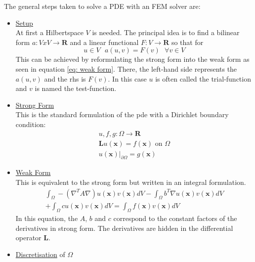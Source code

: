 \documentclass[./\jobname.tex,hidelinks]{subfiles}
\begin{document}
The general steps taken to solve a PDE with an FEM solver are: 
\begin{itemize}
	\item \underline{Setup} \\
		  At first a Hilbertspace $V$ is needed. The principal idea is to find a bilinear form $a: V x V \rightarrow \mathbf{R}$ and a linear functional $F: V \rightarrow \mathbf{R}$ so that for 
		  \begin{equation}
			  u \in V \text{   } a(u,v) = F(v) \text{   } \forall v \in V
		  \end{equation}
		  This can be achieved by reformulating the strong form into the weak form as seen in equation \ref{eq: weak form}. There, the left-hand side represents the $a(u,v)$ and the \gls{rhs} is $F(v)$. In this case $u$ is often called the trial-function and $v$ is named the test-function. 
	\item \underline{Strong Form} \\
		  This is the standard formulation of the \gls{pde} with a Dirichlet boundary condition: \\
		  \begin{equation}
			  \begin{split}
			  	u, f, g: \Omega \rightarrow \mathbf{R} \\
				\mathbf{L} u(\mathbf{x}) = f(\mathbf{x}) \text{ on $\Omega$} \\
				u(\mathbf{x})|_{\partial \Omega} = g(\mathbf{x})
			  \end{split}
		  \end{equation}
	\item \underline{Weak Form} \\
		  This is equivalent to the strong form but written in an integral formulation. \\
		  \begin{equation}
		  \label{eq: weak form}
			  \begin{split}
			      \int_{\Omega} - (\nabla^T A \nabla) u(\mathbf{x}) v(\mathbf{x}) dV - \int_{\Omega} b^T \nabla u(\mathbf{x}) v(\mathbf{x}) dV \\
			      + \int_{\Omega} c u(\mathbf{x}) v(\mathbf{x}) dV = \int_{\Omega} f(\mathbf{x}) v(\mathbf{x}) dV
			  \end{split}
		  \end{equation}
		  In this equation, the $A$, $b$ and $c$ correspond to the constant factors of the derivatives in strong form. The derivatives are hidden in the differential operator $\mathbf{L}$.
	\item \underline{Discretisation} of $\Omega$ \\

\end{itemize}
\end{document}
